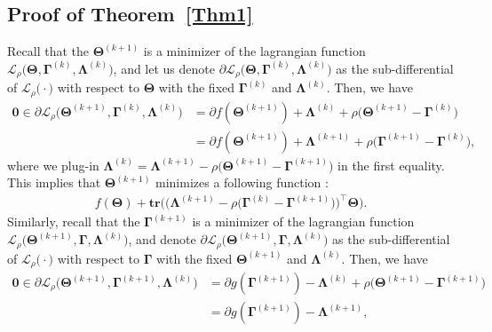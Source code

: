 \documentclass[alpha-refs]{wiley-article}
\begin{document}
\subsection{Proof of Theorem~\ref{Thm1}}
Recall that the $\boldsymbol{\Theta}^{(k+1)}$ is a minimizer of the lagrangian function $\mathcal{L}_{\rho}\big(\boldsymbol{\Theta},\boldsymbol{\Gamma}^{(k)},\boldsymbol{\Lambda}^{(k)} \big)$, and let us denote $\partial\mathcal{L}_{\rho}\big(\boldsymbol{\Theta},\boldsymbol{\Gamma}^{(k)},\boldsymbol{\Lambda}^{(k)} \big)$ as the sub-differential of  $\mathcal{L}_{\rho}\big(\cdot\big)$ with respect to $\boldsymbol{\Theta}$ with the fixed $\boldsymbol{\Gamma}^{(k)}$ and $\boldsymbol{\Lambda}^{(k)}$.
Then, we have 
\begin{align*}
    \boldsymbol{0} \in
    \partial\mathcal{L}_{\rho}\big(\boldsymbol{\Theta}^{(k+1)},\boldsymbol{\Gamma}^{(k)},\boldsymbol{\Lambda}^{(k)} \big) 
    &= \partial f(\boldsymbol{\Theta}^{(k+1)}) + \boldsymbol{\Lambda}^{(k)} + \rho\big( \boldsymbol{\Theta}^{(k+1)} - \boldsymbol{\Gamma}^{(k)} \big) \\
    &= \partial f(\boldsymbol{\Theta}^{(k+1)}) + \boldsymbol{\Lambda}^{(k+1)} + \rho\big( \boldsymbol{\Gamma}^{(k+1)} - \boldsymbol{\Gamma}^{(k)} \big),
\end{align*}
where we plug-in $\boldsymbol{\Lambda}^{(k)}=\boldsymbol{\Lambda}^{(k+1)}-\rho\big( \boldsymbol{\Theta}^{(k+1)} - \boldsymbol{\Gamma}^{(k+1)} \big)$ in the first equality.
This implies that $\boldsymbol{\Theta}^{(k+1)}$ minimizes a following function :
\begin{align} \label{f}
    f(\boldsymbol{\Theta}) + \textbf{tr} \big( \big( \boldsymbol{\Lambda}^{(k+1)} - \rho\big( \boldsymbol{\Gamma}^{(k)} - \boldsymbol{\Gamma}^{(k+1)} \big) \big) ^{\top} \boldsymbol{\Theta} \big).
\end{align}
Similarly, recall that the $\boldsymbol{\Gamma}^{(k+1)}$ is a minimizer of the lagrangian function $\mathcal{L}_{\rho}\big(\boldsymbol{\Theta}^{(k+1)},\boldsymbol{\Gamma},\boldsymbol{\Lambda}^{(k)} \big)$, and denote $\partial\mathcal{L}_{\rho}\big(\boldsymbol{\Theta}^{(k+1)},\boldsymbol{\Gamma},\boldsymbol{\Lambda}^{(k)}\big)$ as the sub-differential of  $\mathcal{L}_{\rho}\big(\cdot\big)$ with respect to $\boldsymbol{\Gamma}$ with the fixed $\boldsymbol{\Theta}^{(k+1)}$ and $\boldsymbol{\Lambda}^{(k)}$.
Then, we have 
\begin{align*}
    \boldsymbol{0} \in
    \partial\mathcal{L}_{\rho}\big(\boldsymbol{\Theta}^{(k+1)},\boldsymbol{\Gamma}^{(k+1)},\boldsymbol{\Lambda}^{(k)} \big) 
    &= \partial g(\boldsymbol{\Gamma}^{(k+1)}) - \boldsymbol{\Lambda}^{(k)} + \rho\big( \boldsymbol{\Theta}^{(k+1)} - \boldsymbol{\Gamma}^{(k+1)} \big) \\
    &= \partial g(\boldsymbol{\Gamma}^{(k+1)}) - \boldsymbol{\Lambda}^{(k+1)},
\end{align*}
\end{document}

